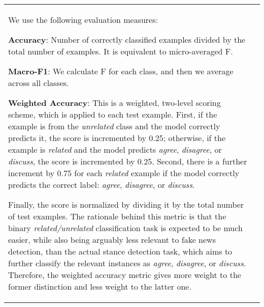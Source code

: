 \documentclass[11pt,a4paper]{article}
\begin{document}
\begin{table}
{\begin{tabularx}{1.15\linewidth}{|lX|}
We use the following evaluation measures:

{\bf Accuracy}: Number of correctly classified examples divided by the total number of examples. It is equivalent to micro-averaged F.

{\bf Macro-F1}: We calculate F for each class, and then we average across all classes. 

{\bf Weighted Accuracy}: This is a weighted, two-level scoring scheme, which is applied to each test example. First, if the example is from the \emph{unrelated} class and the model correctly predicts it, the score is incremented by 0.25; otherwise, if the example is \emph{related} and the model predicts \emph{agree}, \emph{disagree}, or \emph{discuss}, the score is incremented by 0.25. Second, there is a further increment by 0.75 for each \emph{related} example if the model correctly predicts the correct label: \emph{agree}, \emph{disagree}, or \emph{discuss}. 

\noindent Finally, the score is normalized by dividing it by the total number of test examples.
The rationale behind this metric is that the binary \emph{related/unrelated} classification task is expected to be much easier, while also being arguably less relevant to fake news detection, than the actual stance detection task, which aims to further classify the relevant instances as \emph{agree}, \emph{disagree}, or \emph{discuss}. Therefore, the weighted accuracy metric gives more weight to the former distinction and less weight to the latter one.



\end{tabularx}}
\end{table}
\end{document}

